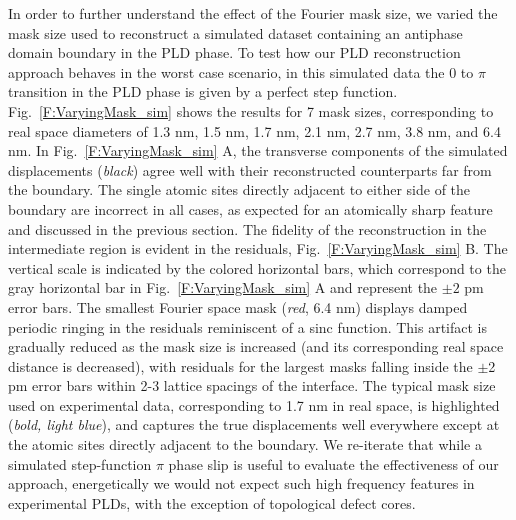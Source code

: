 \documentclass[12pt]{article}
\begin{document}
In order to further understand the effect of the Fourier mask size, we varied the mask size used to reconstruct a simulated dataset containing an antiphase domain boundary in the PLD phase.
To test how our PLD reconstruction approach behaves in the worst case scenario, in this simulated data the $0$ to $\pi$ transition in the PLD phase is given by a perfect step function.
Fig.~\ref{F:VaryingMask_sim} shows the results for 7 mask sizes, corresponding to real space diameters of 1.3 nm, 1.5 nm, 1.7 nm, 2.1 nm, 2.7 nm, 3.8 nm, and 6.4 nm.
In Fig.~\ref{F:VaryingMask_sim} A, the transverse components of the simulated displacements (\textit{black}) agree well with their reconstructed counterparts far from the boundary.
The single atomic sites directly adjacent to either side of the boundary are incorrect in all cases, as expected for an atomically sharp feature and discussed in the previous section.
The fidelity of the reconstruction in the intermediate region is evident in the residuals, Fig.~\ref{F:VaryingMask_sim} B.
The vertical scale is indicated by the colored horizontal bars, which correspond to the gray horizontal bar in Fig.~\ref{F:VaryingMask_sim} A and represent the $\pm2$ pm error bars.
The smallest Fourier space mask (\textit{red}, 6.4 nm) displays damped periodic ringing in the residuals reminiscent of a sinc function.
This artifact is gradually reduced as the mask size is increased (and its corresponding real space distance is decreased), with residuals for the largest masks falling inside the $\pm$2 pm error bars within 2-3 lattice spacings of the interface.
The typical mask size used on experimental data, corresponding to 1.7 nm in real space, is highlighted (\textit{bold, light blue}), and captures the true displacements well everywhere except at the atomic sites directly adjacent to the boundary.
We re-iterate that while a simulated step-function $\pi$ phase slip is useful to evaluate the effectiveness of our approach, energetically we would not expect such high frequency features in experimental PLDs, with the exception of topological defect cores.
\end{document}
